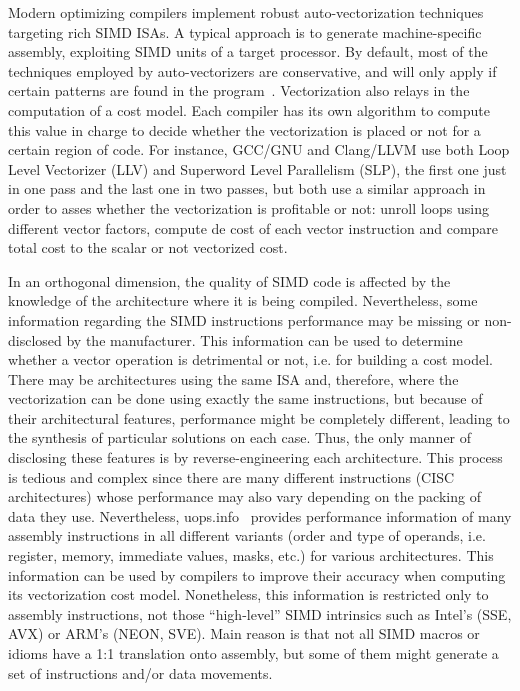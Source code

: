 Modern optimizing compilers implement robust auto-vectorization techniques 
targeting rich SIMD ISAs. A typical approach is to generate machine-specific 
assembly, exploiting SIMD units of a target processor. By default, most of the 
techniques employed by auto-vectorizers are conservative, and will only apply 
if certain patterns are found in the program~\cite{citeneeded}. Vectorization 
also relays in the computation of a cost model. Each compiler has its own 
algorithm to compute this value in charge to decide whether the vectorization 
is placed or not for a certain region of code. For instance, GCC/GNU and 
Clang/LLVM use both Loop Level Vectorizer (LLV) and Superword Level Parallelism 
(SLP), the first one just in one pass and the last one in two passes, but both 
use a similar approach in order to asses whether the vectorization is 
profitable or not: unroll loops using different vector factors, compute de cost 
of each vector instruction and compare total cost to the scalar or not 
vectorized cost.

In an orthogonal dimension, the quality of SIMD code is affected by the 
knowledge of the architecture where it is being compiled. Nevertheless, some 
information regarding the SIMD instructions performance may be missing or 
non-disclosed by the manufacturer. This information can be used to determine 
whether a vector operation is detrimental or not, i.e. for building a cost 
model. There may be architectures using the same ISA and, therefore, where the 
vectorization can be done using exactly the same instructions, but because of 
their architectural features, performance might be completely different, 
leading to the synthesis of particular solutions on each case. Thus, the only 
manner of 
disclosing these features is by reverse-engineering each architecture. This 
process is 
tedious and complex since there are many different instructions (CISC 
architectures) whose 
performance may also vary depending on the packing of data they use. 
Nevertheless, uops.info~\cite{bib:uops} provides performance information of 
many 
assembly instructions in all different variants (order and type of operands, 
i.e. register, memory, immediate values, masks, etc.) for various 
architectures. This information can be used by compilers to improve their 
accuracy when computing its vectorization cost model. Nonetheless, this 
information is 
restricted only 
to 
assembly instructions, not those ``high-level'' SIMD intrinsics such as Intel's 
(SSE, AVX) or ARM's (NEON, SVE). Main reason is that not all SIMD macros or 
idioms have a 1:1 translation onto assembly, but some of them might generate a 
set of instructions and/or data movements.


